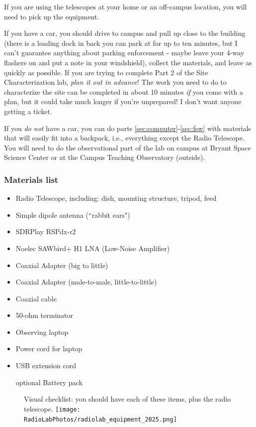 \documentclass[11pt]{article}
\begin{document}
If you are using the telescopes at your home or an off-campus location, you will need to pick up
the equipment.

If you have a car, you should drive to campus and pull up close to the building
(there is a loading dock in back you can park at for up to ten minutes, but I can't guarantee
anything about parking enforcement - maybe leave your 4-way flashers on and put a note in your windshield),
collect the materials, and leave as quickly as possible.
If you are trying to complete Part 2 of the Site Characterization lab, \emph{plan it out in advance}!
The work you need to do to characterize the site can be completed in about 10 minutes \emph{if}
you come with a plan, but it could take much longer if you're unprepared!  I don't want anyone getting a ticket.

If you \emph{do not} have a car, you can do parts \ref{sec:computer}-\ref{sec:fsw}
with materials that will easily fit into a backpack, i.e., everything except the Radio Telescope.
You will need to do the observational part of the lab on campus at Bryant Space Science Center or at
the Campus Teaching Observatory (outside).



\clearpage
\subsubsection{Materials list}
\begin{itemize}
    \item Radio Telescope, including: dish, mounting structure, tripod, feed
    \item Simple dipole antenna (``rabbit ears")
    \item SDRPlay RSPdx-r2
    \item Noelec SAWbird+ H1 LNA (Low-Noise Amplifier)
    \item Coaxial Adapter (big to little)
    \item Coaxial Adapter (male-to-male, little-to-little)
    \item Coaxial cable
    \item 50-ohm terminator
    \item Observing laptop
    \item Power cord for laptop
    \item USB extension cord
    \item [optional] Battery pack
\end{itemize}
\begin{figure}[h]
    \centering
    Visual checklist: you should have each of these items, plus the radio telescope.
    \texttt{[image: RadioLabPhotos/radiolab\_equipment\_2025.png]}
\end{figure}
\end{document}
